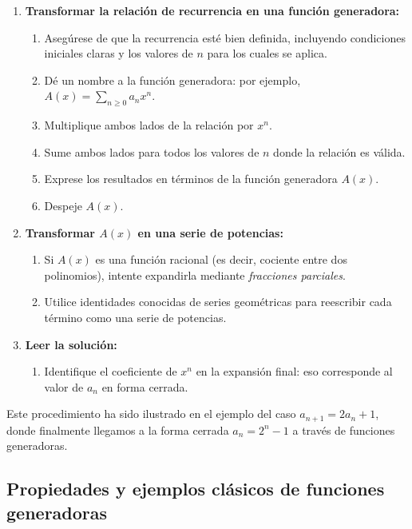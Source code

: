 \begin{enumerate}
  \item \textbf{Transformar la relación de recurrencia en una función generadora:}
  \begin{enumerate}[label=\alph*)]
    \item Asegúrese de que la recurrencia esté bien definida, incluyendo condiciones iniciales claras y los valores de $n$ para los cuales se aplica.
    \item Dé un nombre a la función generadora: por ejemplo, $A(x) = \sum_{n \geq 0} a_n x^n$.
    \item Multiplique ambos lados de la relación por $x^n$.
    \item Sume ambos lados para todos los valores de $n$ donde la relación es válida.
    \item Exprese los resultados en términos de la función generadora $A(x)$.
    \item Despeje $A(x)$.
  \end{enumerate}

  \item \textbf{Transformar $A(x)$ en una serie de potencias:}
  \begin{enumerate}[label=\alph*)]
    \item Si $A(x)$ es una función racional (es decir, cociente entre dos polinomios), intente expandirla mediante \emph{fracciones parciales}.
    \item Utilice identidades conocidas de series geométricas para reescribir cada término como una serie de potencias.
  \end{enumerate}

  \item \textbf{Leer la solución:}
  \begin{enumerate}[label=\alph*)]
    \item Identifique el coeficiente de $x^n$ en la expansión final: eso corresponde al valor de $a_n$ en forma cerrada.
  \end{enumerate}
\end{enumerate}

Este procedimiento ha sido ilustrado en el ejemplo del caso $a_{n+1} = 2a_n + 1$, donde finalmente llegamos a la forma cerrada $a_n = 2^n - 1$ a través de funciones generadoras.

\subsection{Propiedades y ejemplos clásicos de funciones generadoras}

